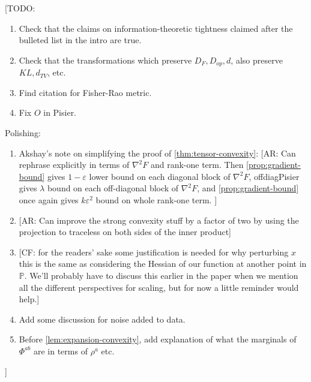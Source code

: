 \documentclass[aos]{imsart}
\theoremstyle{definition}
\numberwithin{equation}{section}
\newcommand{\eps}{\varepsilon}
\newcommand{\SPD}{\mathbb{P}}
\newcommand{\samp}{x}
\newcommand{\CF}[1]{{\color{purple}[CF: #1]}}
\newcommand{\AR}[1]{{\color{orange}[AR: #1]}}
\newcommand{\TODO}[1]{{\color{blue}[TODO: #1]}}
\begin{document}
\tableofcontents

\TODO{
\begin{enumerate}
\item Check that the claims on information-theoretic tightness claimed after the bulleted list in the intro are true. 
\item Check that the transformations which preserve $D_F, D_{op}, d$, also preserve $KL, d_{TV}$, etc. 
\item Find citation for Fisher-Rao metric.
\item Fix $O$ in Pisier.
\end{enumerate}
Polishing:
\begin{enumerate}
\item Akshay's note on simplifying the proof of \cref{thm:tensor-convexity}: \AR{Can rephrase explicitly in terms of $\nabla^{2} F$ and rank-one term. Then \cref{prop:gradient-bound} gives $1-\eps$ lower bound on each diagonal block of $\nabla^{2} F$, offdiagPisier gives $\lambda$ bound on each off-diagonal block of $\nabla^{2} F$, and \cref{prop:gradient-bound} once again gives $k \eps^{2}$ bound on whole rank-one term.  }
\item \AR{Can improve the strong convexity stuff by a factor of two by using the projection to traceless on both sides of the inner product}
\item \CF{for the readers' sake some justification is needed for why perturbing $\samp$ this is the same as considering the Hessian of our function at another point in $\SPD$. We'll probably have to discuss this earlier in the paper when we mention all the different perspectives for scaling, but for now a little reminder would help.}
\item Add some discussion for noise added to data.
\item Before \cref{lem:expansion-convexity}, add explanation of what the marginals of $\Phi^{ab}$ are in terms of $\rho^{a}$ etc.
\end{enumerate}
}
\end{document}
